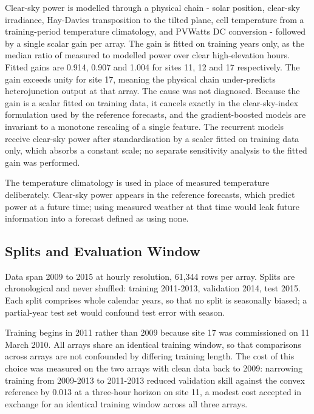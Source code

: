Clear-sky power is modelled through a physical chain - solar position,
clear-sky irradiance, Hay-Davies transposition to the tilted plane, cell
temperature from a training-period temperature climatology, and PVWatts
DC conversion - followed by a single scalar gain per array. The gain is
fitted on training years only, as the median ratio of measured to
modelled power over clear high-elevation hours. Fitted gains are 0.914,
0.907 and 1.004 for sites 11, 12 and 17 respectively. The gain exceeds
unity for site 17, meaning the physical chain under-predicts
heterojunction output at that array. The cause was not diagnosed.
Because the gain is a scalar fitted on training data, it cancels exactly
in the clear-sky-index formulation used by the reference forecasts, and
the gradient-boosted models are invariant to a monotone rescaling of a
single feature. The recurrent models receive clear-sky power after
standardisation by a scaler fitted on training data only, which absorbs
a constant scale; no separate sensitivity analysis to the fitted gain
was performed.

The temperature climatology is used in place of measured temperature
deliberately. Clear-sky power appears in the reference forecasts, which
predict power at a future time; using measured weather at that time
would leak future information into a forecast defined as using none.

\subsection{Splits and Evaluation Window}

Data span 2009 to 2015 at hourly resolution, 61,344 rows per array.
Splits are chronological and never shuffled: training 2011-2013,
validation 2014, test 2015. Each split comprises whole calendar years,
so that no split is seasonally biased; a partial-year test set would
confound test error with season.

Training begins in 2011 rather than 2009 because site 17 was
commissioned on 11 March 2010. All arrays share an identical training
window, so that comparisons across arrays are not confounded by
differing training length. The cost of this choice was measured on the
two arrays with clean data back to 2009: narrowing training from
2009-2013 to 2011-2013 reduced validation skill against the convex
reference by 0.013 at a three-hour horizon on site 11, a modest cost
accepted in exchange for an identical training window across all three
arrays.

